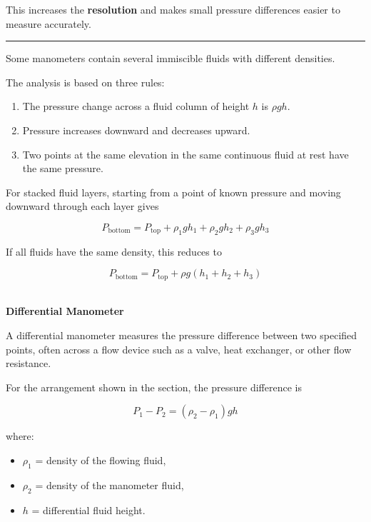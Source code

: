 \documentclass[12pt]{article}
\newcommand{\mysubsection}[2]{%
    \noindent{\headingfont\large #1\space #2\par}
    \vspace{4pt}
    \hrule
    \vspace{15pt}
}
\begin{document}
This increases the \textbf{resolution} and makes small pressure differences easier to measure accurately.

\mysubsection{}{Multifluid Manometers}

Some manometers contain several immiscible fluids with different densities.

The analysis is based on three rules:
\begin{enumerate}
    \item The pressure change across a fluid column of height $h$ is $\rho gh$.
    \item Pressure increases downward and decreases upward.
    \item Two points at the same elevation in the same continuous fluid at rest have the same pressure.
\end{enumerate}

For stacked fluid layers, starting from a point of known pressure and moving downward through each layer gives

\begin{equation*}
    P_{\mathrm{bottom}}
    =
    P_{\mathrm{top}}
    +
    \rho_1gh_1
    +
    \rho_2gh_2
    +
    \rho_3gh_3
\end{equation*}

If all fluids have the same density, this reduces to

\begin{equation*}
    P_{\mathrm{bottom}}
    =
    P_{\mathrm{top}}
    +
    \rho g(h_1+h_2+h_3)
\end{equation*}

\textbf{\\ Differential Manometer}

A differential manometer measures the pressure difference between two specified points, often across a flow device such as a valve, heat exchanger, or other flow resistance.

For the arrangement shown in the section, the pressure difference is

\begin{equation*}
    P_1-P_2
    =
    (\rho_2-\rho_1)gh
\end{equation*}

where:
\begin{itemize}
    \item $\rho_1$ = density of the flowing fluid,
    \item $\rho_2$ = density of the manometer fluid,
    \item $h$ = differential fluid height.
\end{itemize}
\end{document}
